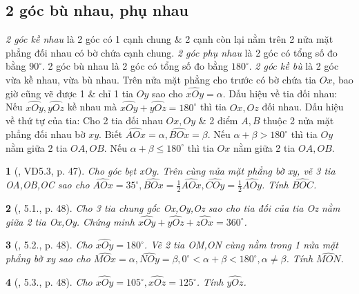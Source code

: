 \documentclass{article}
\newtheorem{baitoan}{}
\begin{document}
\subsection{2 góc bù nhau, phụ nhau}
 \textit{2 góc kề nhau} là 2 góc có 1 cạnh chung \& 2 cạnh còn lại nằm trên 2 nửa mặt phẳng đối nhau có bờ chứa cạnh chung.  \textit{2 góc phụ nhau} là 2 góc có tổng số đo bằng $90^\circ$. 2 góc bù nhau là 2 góc có tổng số đo bằng $180^\circ$.  \textit{2 góc kề bù} là 2 góc vừa kề nhau, vừa bù nhau.  Trên nửa mặt phẳng cho trước có bờ chứa tia $Ox$, bao giờ cũng vẽ được 1 \& chỉ 1 tia $Oy$ sao cho $\widehat{xOy} = \alpha$.  {\sf Dấu hiệu về tia đối nhau}: Nếu $\widehat{xOy},\widehat{yOz}$ kề nhau mà $\widehat{xOy} + \widehat{yOz} = 180^\circ$ thì tia $Ox,Oz$ đối nhau.  {\sf Dấu hiệu về thứ tự của tia}: Cho 2 tia đối nhau $Ox,Oy$ \& 2 điểm $A,B$ thuộc 2 nửa mặt phẳng đối nhau bờ $xy$. Biết $\widehat{AOx} = \alpha,\widehat{BOx} = \beta$. Nếu $\alpha + \beta > 180^\circ$ thì tia $Oy$ nằm giữa 2 tia $OA,OB$. Nếu $\alpha + \beta\le180^\circ$ thì tia $Ox$ nằm giữa 2 tia $OA,OB$.

\begin{baitoan}[\cite{TLCT_THCS_Toan_6_hinh_hoc}, VD5.3, p. 47]
	Cho góc bẹt xOy. Trên cùng nửa mặt phẳng bờ xy, vẽ 3 tia OA,OB,OC sao cho $\widehat{AOx} = 35^\circ,\widehat{BOx} = \frac{1}{2}\widehat{AOx},\widehat{COy} = \frac{1}{2}\widehat{AOy}$. Tính $\widehat{BOC}$.
\end{baitoan}

\begin{baitoan}[\cite{TLCT_THCS_Toan_6_hinh_hoc}, 5.1., p. 48]
	Cho 3 tia chung gốc Ox,Oy,Oz sao cho tia đối của tia Oz nằm giữa 2 tia Ox,Oy. Chứng minh $\widehat{xOy} + \widehat{yOz} + \widehat{zOx} = 360^\circ$.
\end{baitoan}

\begin{baitoan}[\cite{TLCT_THCS_Toan_6_hinh_hoc}, 5.2., p. 48]
	Cho $\widehat{xOy} = 180^\circ$. Vẽ 2 tia OM,ON cùng nằm trong 1 nửa mặt phẳng bờ xy sao cho $\widehat{MOx} = \alpha,\widehat{NOy} = \beta,0^\circ < \alpha + \beta < 180^\circ,\alpha\ne\beta$. Tính $\widehat{MON}$.
\end{baitoan}

\begin{baitoan}[\cite{TLCT_THCS_Toan_6_hinh_hoc}, 5.3., p. 48]
	Cho $\widehat{xOy} = 105^\circ,\widehat{xOz} = 125^\circ$. Tính $\widehat{yOz}$.
\end{baitoan}
\end{document}
